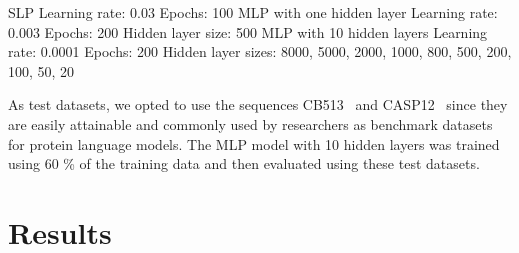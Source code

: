 \begin{outline}
    \1 SLP
      \2 Learning rate: 0.03
      \2 Epochs: 100
    \1 MLP with one hidden layer
      \2 Learning rate: 0.003
      \2 Epochs: 200
      \2 Hidden layer size: 500
    \1 MLP with 10 hidden layers
      \2 Learning rate: 0.0001
      \2 Epochs: 200
      \2 Hidden layer sizes: 8000, 5000, 2000, 1000, 800, 500, 200, 100, 50, 20
\end{outline}

As test datasets, we opted to use the sequences CB513~\cite{cb513} and CASP12~\cite{casp12} since they are easily attainable and commonly used by researchers as benchmark datasets for protein language models. The MLP model with 10 hidden layers was trained using 60 \% of the training data and then evaluated using these test datasets.
\section{Results}
